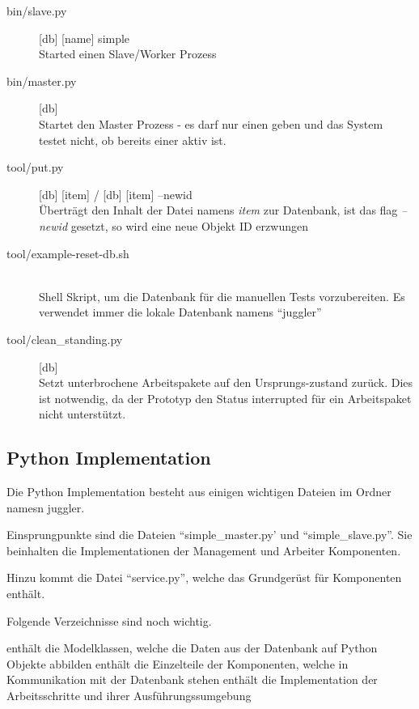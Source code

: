 \begin{description}
    \item[bin/slave.py] [db] [name] simple \hfill \\
        Started einen Slave/Worker Prozess
    \item[bin/master.py] [db] \hfill \\
        Startet den Master Prozess - es darf nur einen geben und das System testet nicht, ob bereits einer aktiv ist.
    \item[tool/put.py] [db] [item] / [db] [item] --newid \hfill \\
        Überträgt den Inhalt der Datei namens \textit{item} zur Datenbank,
        ist das flag \textit{--newid} gesetzt, so wird eine neue Objekt ID erzwungen
    \item[tool/example-reset-db.sh] \hfill \\
        Shell Skript, um die Datenbank für die manuellen Tests vorzubereiten.
        Es verwendet immer die lokale Datenbank namens ``juggler''
    \item[tool/clean\_standing.py] [db]\hfill \\
        Setzt unterbrochene Arbeitspakete auf den Ursprungs-zustand zurück.
        Dies ist notwendig, da der Prototyp den Status interrupted für ein Arbeitspaket nicht unterstützt.
\end{description}

\subsection{Python Implementation}

Die Python Implementation besteht aus einigen wichtigen Dateien im Ordner namesn juggler.

Einsprungpunkte sind die Dateien ``simple\_master.py' und ``simple\_slave.py''.
Sie beinhalten die Implementationen der Management und Arbeiter Komponenten.

Hinzu kommt die Datei ``service.py'', welche das Grundgerüst für Komponenten enthält.

Folgende Verzeichnisse sind noch wichtig.

\begin{description}
    \dhitem[model] 
        enthält  die Modelklassen,
        welche die Daten aus der Datenbank auf Python Objekte abbilden
    \dhitem[handler] 
        enthält die Einzelteile der Komponenten,
        welche in Kommunikation mit der Datenbank stehen
    \dhitem[process]
        enthält die Implementation der Arbeitsschritte
        und ihrer Ausführungssumgebung
\end{description}



